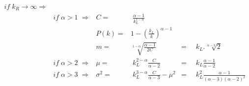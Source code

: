 \documentclass[10pt,letterpaper]{article}
\begin{document}
\begin{align}\label{eq:md}
	if \; k_R \rightarrow \infty \Rightarrow & & \nonumber\\
											      & if\; \alpha>1 \;\Rightarrow	& C = &\; \frac{\alpha-1}{k_L^{1-\alpha}}\nonumber\\
							   & & P(k) =& 1-\left(\frac{k_L}{k}\right)^{\alpha-1}\nonumber\\
										       &  & m  = & \sqrt[1-\alpha]{\frac{\alpha-1}{2C}}&=&\;\;k_L.\sqrt[\alpha-1]{2}&\\
							   & if\; \alpha>2 \;\Rightarrow	& \mu = & \;k_L^{2-\alpha}\frac{C}{\alpha-2}&= &\;\;k_L\frac{\alpha-1}{\alpha-2}& \nonumber\\
							& if\; \alpha>3 \;\Rightarrow	& \sigma^2 = & \;k_L^{3-\alpha}\frac{C}{\alpha-3}-\mu^2&= &\;\;k_L^2\frac{\alpha-1}{(\alpha-3)(\alpha-2)^2}&\nonumber
\end{align}





\nolinenumbers

%
%
% 

\end{document}
